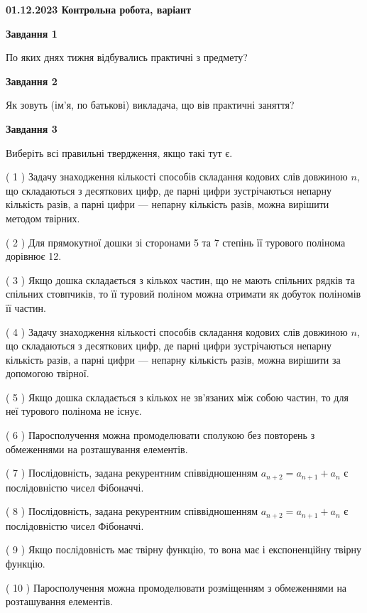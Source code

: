 \documentclass[12pt, ukrainian]{article}
\begin{document}
\begin {large}

\textbf{01.12.2023 Контрольна робота, варіант  }\par


{
{\begin {center}\textbf{Завдання 1}\end {center}}\par
По яких днях тижня відбувались практичні з предмету?\par
{\begin {center}\textbf{Завдання 2}\end {center}}\par
Як зовуть (ім'я, по батькові) викладача, що вів практичні заняття?\par
{\begin {center}\textbf{Завдання 3}\end {center}}\par
Виберіть всі правильні твердження, якщо такі тут є.\par
\vspace{2mm}
( 1 ) Задачу знаходження кількості способів складання кодових слів довжиною $n$, що складаються з десяткових цифр, де парні цифри зустрічаються непарну кількість разів, а парні цифри — непарну кількість разів, можна вирішити методом твірних.%

( 2 ) Для прямокутної дошки зі сторонами 5 та 7 степінь її турового полінома дорівнює 12.%

( 3 ) Якщо дошка складається з кількох частин, що не мають спільних рядків та спільних стовпчиків, то її туровий поліном можна отримати як добуток поліномів її частин.%

( 4 ) Задачу знаходження кількості способів складання кодових слів довжиною $n$, що складаються з десяткових цифр, де парні цифри зустрічаються непарну кількість разів, а парні цифри — непарну кількість разів, можна вирішити за допомогою твірної.%

( 5 ) Якщо дошка складається з кількох не зв’язаних між собою частин, то для неї турового полінома не існує.%

( 6 ) Паросполучення можна промоделювати сполукою без повторень з обмеженнями на розташування елементів.%

( 7 ) Послідовність, задана рекурентним співвідношенням $a_{n+2}=a_{n+1}+a_{n}$ є послідовністю чисел Фібоначчі.%

( 8 ) Послідовність, задана рекурентним співвідношенням $a_{n+2}=a_{n+1}+a_{n}$ є послідовністю чисел Фібоначчі.%

( 9 ) Якщо послідовність має твірну функцію, то вона має і експоненційну твірну функцію.%

( 10 ) Паросполучення можна промоделювати розміщенням з обмеженнями на розташування елементів.%
}
\end {large}

\vspace{4mm}
\newpage
\end{document}
